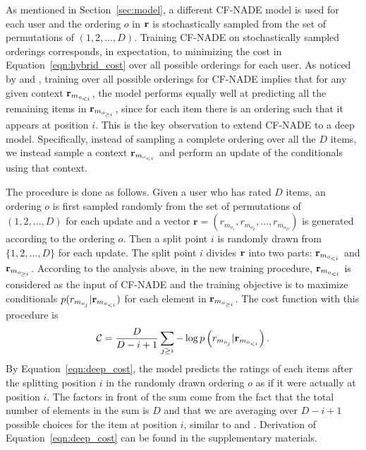 \documentclass{article}
\newcommand{\cfnade}{CF-NADE\xspace}
\newcommand{\cost}{\mathcal{C}}
\begin{document}
As mentioned in Section~\ref{sec:model}, a different \cfnade model is
used for each user and the ordering $o$ in $\bf r$ is stochastically
sampled from the set of permutations of $(1,2,\ldots,D)$. Training
\cfnade on stochastically sampled orderings corresponds, in
expectation, to minimizing the cost in Equation~\ref{eqn:hybrid_cost}
over all possible orderings for each user. As noticed by
\citet{Uria2013b} and \citet{zheng15deep}, training over all possible
orderings for \cfnade implies that for any given context
${\bf r}_{{m}_{o_{<i}}}$, the model performs equally well at
predicting all the remaining items in ${\bf r}_{{m}_{o_{\ge i}}}$,
since for each item there is an ordering such that it appears at
position $i$. This is the key
observation to extend \cfnade to a deep model. Specifically, instead
of sampling a complete ordering over all the $D$ items, we instead
sample a context ${\bf r}_{{ m}_{o_{<i}}}$ and perform an update of
the conditionals using that context.

The procedure is done as follows. Given a user who has rated $D$
items, an ordering $o$ is first sampled randomly from the set of
permutations of $(1,2,\ldots,D)$ for each update and a vector
$\mathbf{r} = (r_{m_{o_1}}, r_{m_{o_2}}, \ldots, r_{m_{o_D}})$ is
generated according to the ordering $o$. Then a split point $i$ is
randomly drawn from $\{1,2,\dots,D\}$ for each update. The split point
$i$ divides ${\bf r}$ into two parts: ${\bf r}_{{m}_{o_{<i}}}$ and
${\bf r}_{{m}_{o_{\ge i}}}$. According to the analysis above, in the
new training procedure, ${\bf r}_{{m}_{o_{<i}}}$ is considered as the
input of \cfnade and the training objective is to maximize
conditionals $p(r_{m_{o_j}}|{\bf r}_{m_{o_{<i}}})$ for each element in
${\bf r}_{{m}_{o_{\ge i}}}$. The cost function with this procedure is
\begin{equation}
\cost = \frac{D}{D-i+1}\sum_{j\ge i} -\log p\left(r_{m_{o_j}}|{\bf r}_{m_{o_{<i}}}\right).
\label{eqn:deep_cost}
\end{equation}
By Equation~\ref{eqn:deep_cost}, the model predicts the ratings of
each items after the splitting position $i$ in the randomly drawn
ordering $o$ as if it were actually at position $i$. The factors in
front of the sum come from the fact that the total number of elements
in the sum is $D$ and that we are averaging over $D-i+1$ possible
choices for the item at position $i$, similar to \citep{Uria2013b} and
\citep{zheng15deep}. Derivation of Equation~\ref{eqn:deep_cost} can be
found in the supplementary materials.
\end{document}
